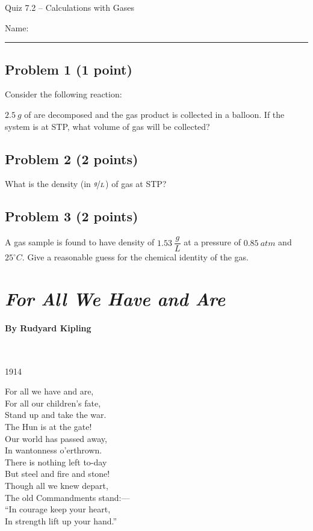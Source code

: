 \documentclass[11pt, letterpaper]{memoir}
\begin{document}
	\begin{center}
		{\large	Quiz 7.2 -- Calculations with Gases}
	\end{center}
{\large Name: \rule[-1mm]{4in}{.1pt}
	
	\subsection*{Problem 1 (1 point)}
	Consider the following reaction: 
	
	\noindent $2.5~g$ of  are decomposed and the gas product is collected in a balloon. If the system is at STP, what volume of gas will be collected?
	
	\vspace{10em}
	\subsection*{Problem 2 (2 points)}
	What is the density (in $\nicefrac{g}{L}$) of  gas at STP?
	
	\vspace{10em}
	\subsection*{Problem 3 (2 points)}
	A gas sample is found to have density of $1.53~\dfrac{g}{L}$ at a pressure of $0.85~atm$ and $25^\circ C$. Give a reasonable guess for the chemical identity of the gas.

\newpage
\pagestyle{empty}
\addtocounter{page}{-1}
\section*{\emph{For All We Have and Are}}
\paragraph{By Rudyard Kipling}~

\vspace{1em}
\begin{minipage}[t]{0.49\linewidth}
	{\large \hspace{2em}1914}

	For all we have and are,\\
	For all our children's fate,\\
	Stand up and take the war.\\
	The Hun is at the gate!\\
	Our world has passed away,\\
	In wantonness o'erthrown.\\
	There is nothing left to-day\\
	But steel and fire and stone!\\
	Though all we knew depart,\\
	The old Commandments stand:—\\
	“In courage keep your heart,\\
	In strength lift up your hand.”


\end{minipage}}
\end{document}
